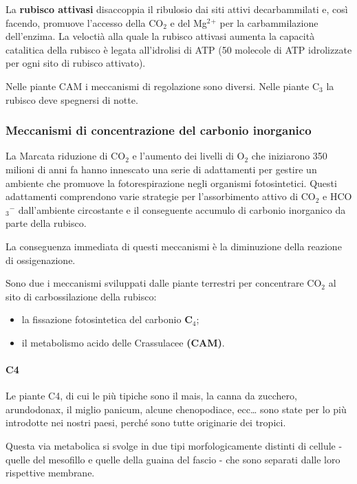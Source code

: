 \documentclass[]{article}
\begin{document}
La \textbf{rubisco attivasi} disaccoppia il ribulosio dai siti attivi
decarbammilati e, così facendo, promuove l'accesso della CO$_2$ e del
Mg$^2$$^+$ per la carbammilazione dell'enzima. La veloctià alla quale la
rubisco attivasi aumenta la capacità catalitica della rubisco è legata
all'idrolisi di ATP (50 molecole di ATP idrolizzate per ogni sito di
rubisco attivato).

Nelle piante CAM i meccanismi di regolazione sono diversi. Nelle piante
C$_3$ la rubisco deve spegnersi di notte.

\subsubsection{Meccanismi di concentrazione del carbonio
inorganico}\label{meccanismi-di-concentrazione-del-carbonio-inorganico}

La Marcata riduzione di CO$_2$ e l'aumento dei livelli di O$_2$ che
iniziarono 350 milioni di anni fa hanno innescato una serie di
adattamenti per gestire un ambiente che promuove la fotorespirazione
negli organismi fotosintetici. Questi adattamenti comprendono varie
strategie per l'assorbimento attivo di CO$_2$ e HCO$_3$$^-$
dall'ambiente circostante e il conseguente accumulo di carbonio
inorganico da parte della rubisco.

La conseguenza immediata di questi meccanismi è la diminuzione della
reazione di ossigenazione.

Sono due i meccanismi sviluppati dalle piante terrestri per concentrare
CO$_2$ al sito di carbossilazione della rubisco:

\begin{itemize}
\itemsep1pt\parskip0pt
\item
  la fissazione fotosintetica del carbonio \textbf{C$_4$};
\item
  il metabolismo acido delle Crassulacee \textbf{(CAM)}.
\end{itemize}

\paragraph{C4}\label{c4}

Le piante C4, di cui le più tipiche sono il mais, la canna da zucchero,
arundodonax, il miglio panicum, alcune chenopodiace, ecc\ldots{} sono
state per lo più introdotte nei nostri paesi, perché sono tutte
originarie dei tropici.

Questa via metabolica si svolge in due tipi morfologicamente distinti di
cellule - quelle del mesofillo e quelle della guaina del fascio - che
sono separati dalle loro rispettive membrane.
\end{document}
